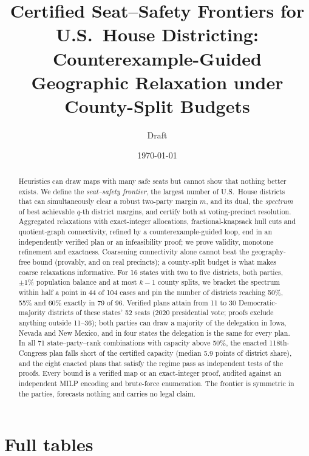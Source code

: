 \documentclass[11pt]{article}
\title{Certified Seat--Safety Frontiers for U.S.\ House Districting:\\ Counterexample-Guided Geographic Relaxation under County-Split Budgets}
\author{Draft}
\date{\today}
\theoremstyle{definition}
\theoremstyle{remark}
\begin{document}
\maketitle
\begin{abstract}
Heuristics can draw maps with many safe seats but cannot show that nothing better exists. We define the \emph{seat--safety frontier}, the largest number of U.S.\ House districts that can simultaneously clear a robust two-party margin $m$, and its dual, the \emph{spectrum} of best achievable $q$-th district margins, and certify both at voting-precinct resolution. Aggregated relaxations with exact-integer allocations, fractional-knapsack hull cuts and quotient-graph connectivity, refined by a counterexample-guided loop, end in an independently verified plan or an infeasibility proof; we prove validity, monotone refinement and exactness. Coarsening connectivity alone cannot beat the geography-free bound (provably, and on real precincts); a county-split budget is what makes coarse relaxations informative. For 16 states with two to five districts, both parties, $\pm1\%$ population balance and at most $k-1$ county splits, we bracket the spectrum within half a point in 44 of 104 cases and pin the number of districts reaching 50\%, 55\% and 60\% exactly in 79 of 96. Verified plans attain from 11 to 30 Democratic-majority districts of these states' 52 seats (2020 presidential vote; proofs exclude anything outside 11--36); both parties can draw a majority of the delegation in Iowa, Nevada and New Mexico, and in four states the delegation is the same for every plan. In all 71 state--party--rank combinations with capacity above 50\%, the enacted 118th-Congress plan falls short of the certified capacity (median 5.9 points of district share), and the eight enacted plans that satisfy the regime pass as independent tests of the proofs. Every bound is a verified map or an exact-integer proof, audited against an independent MILP encoding and brute-force enumeration. The frontier is symmetric in the parties, forecasts nothing and carries no legal claim.
\end{abstract}







\clearpage
\appendix
\section{Full tables}\label{app:tables}
\begin{table}[!tbp]
\centering\footnotesize
\caption{Upper bounds and incumbents for the share of the most extreme district ($q=1$), in percent of the two-party vote: geography-free hull bound, quotient-connectivity relaxations without budget (counties as cells; after two refinement levels), unconstrained ReCom incumbent, and the certified bracket under $s=k-1$.}\label{tab:ablation}
\end{table}

{\footnotesize}
\end{document}
